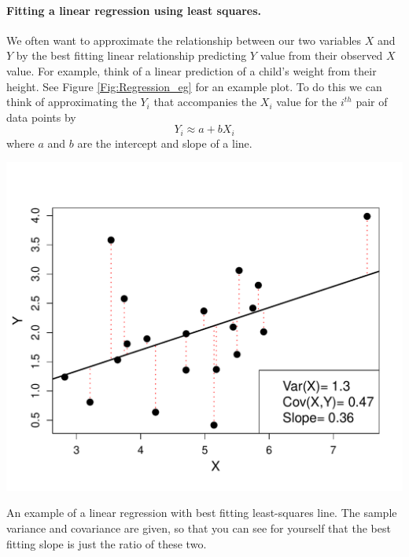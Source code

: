 \paragraph{Fitting a linear regression using least squares.}
We often want to approximate the relationship between our two variables
$X$ and $Y$ by the best fitting linear relationship predicting $Y$
value from their observed $X$
value. For example, think of a linear prediction of a child's weight from their height. 
See Figure \ref{Fig:Regression_eg} for an example plot. To do this we can think of approximating the $Y_i$ that
accompanies the $X_i$ value for the $i^{th}$ pair of data points by
\begin{equation}
Y_i \approx a+ b X_i 
\end{equation}
where $a$ and $b$ are the intercept and slope of a line.

 \begin{marginfigure}
 \begin{center}
   \includegraphics[width=\textwidth]{math_background/dist_pics/Linear_regression.pdf}\end{center}
 \caption{An example of a linear regression with best fitting
   least-squares line. The sample variance and covariance are given,
   so that you can see for yourself that the best fitting slope is
   just the ratio of these two. 
   }\label{Fig:Regression_eg}
 \end{marginfigure}

